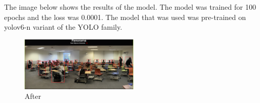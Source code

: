 The image below shows the results of the model. The model was trained for 100 epochs and the loss was 0.0001. The model that was used was pre-trained on yolov6-n variant of the YOLO family. \\

\begin{figure}[h]
    \centering
    \includegraphics[width=0.5\textwidth]{images/After.png}
    \caption{After}
    \label{fig:after}
\end{figure}

